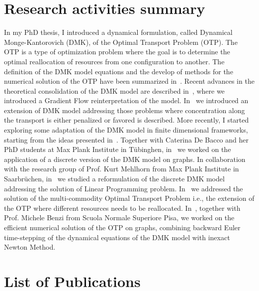 \documentclass[11pt,a4paper,roman]{moderncv}
\begin{document}
\section{Research activities summary}
In my PhD thesis, I introduced a dynamical formulation, called
Dynamical Monge-Kantorovich (DMK), of the Optimal Transport Problem
(OTP). The OTP is a type of optimization problem where the goal is to
determine the optimal reallocation of resources from one configuration
to another.  The definition of the DMK model equations and the develop
of methods for the numerical solution of the OTP have been summarized
in~\cite{Facca-et-al:2018,Facca-et-al-numeric:2020,Bergamaschi-et-al:2018}.
Recent advances in the theoretical consolidation of the DMK model are
described in~\cite{FaccaPiazzon:2019}, where we introduced a Gradient
Flow reinterpretation of the model. In~\cite{Facca-et-al-branch:2018}
we introduced an extension of DMK model addressing those problems
where concentration along the transport is either penalized or favored
is described.  More recently, I started exploring some adaptation of
the DMK model in finite dimensional frameworks, starting from the
ideas presented in~\cite{Facca-et-al-discrete:2018}.  Together with
Caterina De Bacco and her PhD students at Max Plank Institute in
T\"ubinghen, in~\cite{BaLe2020,lonardi2020optimal} we worked on the
application of a discrete version of the DMK model on graphs.  In
collaboration with the research group of Prof. Kurt Mehlhorn from Max
Plank Institute in Saarbr\"uchen,
in~\cite{Facca-et-al-nonuniform:2020} we studied a reformulation of
the discrete DMK model addressing the solution of Linear Programming
problem.  In~\cite{BoFa2020} we addressed the solution of the
multi-commodity Optimal Transport Problem i.e., the extension of the
OTP where different resources needs to be
reallocated. In~\cite{FaBe2020}, together with Prof. Michele Benzi
from Scuola Normale Superiore Pisa, we worked on the efficient
numerical solution of the OTP on graphs, combining backward Euler
time-stepping of the dynamical equations of the DMK model with inexact
Newton Method.

\section{List of Publications}
\begin{refsection}
\nocite{*}
\printbibliography[title={PhD Thesis}, type=misc, omitnumbers=true]%
\end{refsection}
\end{document}
